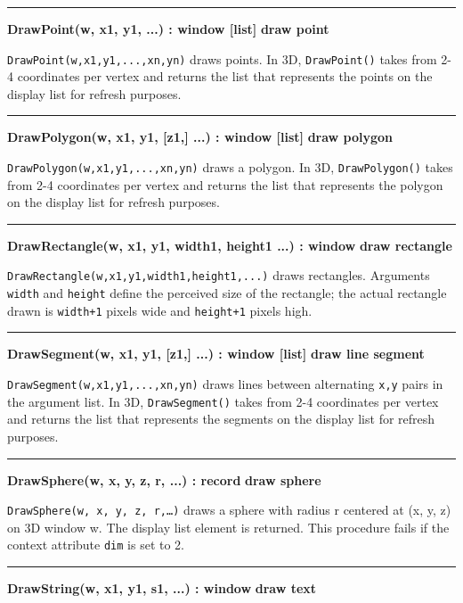 \bigskip\hrule\vspace{0.1cm}
\noindent
{\bf DrawPoint(w, x1, y1, ...) : window [list] } \hfill {\bf draw point}

\noindent
\texttt{DrawPoint(w,x1,y1,...,xn,yn)} draws points. In 3D,
\texttt{DrawPoint()} takes from 2-4 coordinates per vertex and returns
the list that represents the points on the display list for refresh
purposes.

\bigskip\hrule\vspace{0.1cm}
\noindent
{\bf DrawPolygon(w, x1, y1, [z1,] ...) : window [list] } \hfill {\bf draw polygon}

\noindent
\texttt{DrawPolygon(w,x1,y1,...,xn,yn)} draws a polygon. In 3D,
\texttt{DrawPolygon()} takes from 2-4 coordinates per vertex and returns the
list that represents the polygon on the display list for refresh
purposes.

\bigskip\hrule\vspace{0.1cm}
\noindent
{\bf DrawRectangle(w, x1, y1, width1, height1 ...) : window } \hfill {\bf draw rectangle}

\noindent
\texttt{DrawRectangle(w,x1,y1,width1,height1,...)} draws rectangles.
Arguments \texttt{width} and \texttt{height} define the perceived size
of the rectangle; the actual rectangle drawn is \texttt{width+1} pixels
wide and \texttt{height+1} pixels high.

\bigskip\hrule\vspace{0.1cm}
\noindent
{\bf DrawSegment(w, x1, y1, [z1,] ...) : window [list] } \hfill {\bf draw line segment}

\noindent
\texttt{DrawSegment(w,x1,y1,...,xn,yn)} draws lines between alternating
\texttt{x,y} pairs in the argument list. In 3D, \texttt{DrawSegment()}
takes from 2-4 coordinates per vertex and returns the list that
represents the segments on the display list for refresh purposes.

\bigskip\hrule\vspace{0.1cm}
\noindent
{\bf DrawSphere(w, x, y, z, r, ...) : record } \hfill {\bf draw sphere}

\noindent
\texttt{DrawSphere(w, x, y, z, r,{\dots})} draws a sphere with radius
r centered at (x, y, z) on 3D window w. The display list element is
returned. This procedure fails if the context attribute \texttt{dim} is
set to 2.

\bigskip\hrule\vspace{0.1cm}
\noindent
{\bf DrawString(w, x1, y1, s1, ...) : window } \hfill {\bf draw text}

